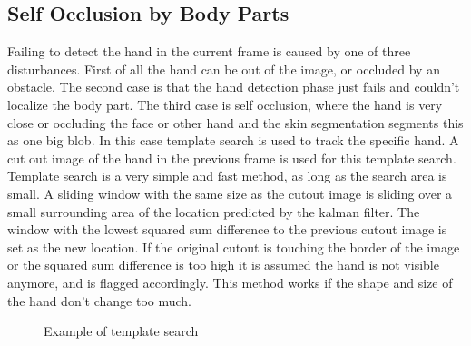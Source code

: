 \subsection*{Self Occlusion by Body Parts}
Failing to detect the hand in the current frame is caused by one of three disturbances. First of all the hand can be out of the image, or occluded by an obstacle. The second case is that the hand detection phase just fails and couldn't localize the body part. The third case is self occlusion, where the hand is very close or occluding the face or other hand and the skin segmentation segments this as one big blob. In this case template search is used to track the specific hand. A cut out image of the hand in the previous frame is used for this template search. Template search is a very simple and fast method, as long as the search area is small. A sliding window  with the same size as the cutout image is sliding over a small surrounding area of the location predicted by the kalman filter. The window with the lowest squared sum difference to the previous cutout image is set as the new location. If the original cutout is touching the border of the image or the squared sum difference is too high it is assumed the hand is not visible anymore, and is flagged accordingly. This method works if the shape and size of the hand don't change too much.

\begin{figure}[htbp]
\begin{center}
\hspace{0.03\linewidth}
\end{center}
\caption{Example of template search}
\label{fig:templatesearch}
\end{figure}

